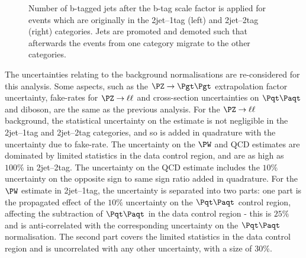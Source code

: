 \begin{figure}
\begin{center}

\end{center}
\caption{
Number of b-tagged jets after the b-tag scale factor is applied for events which
are originally in the 2jet--1tag (left) and 2jet--2tag (right) categories. Jets
are promoted and demoted such that afterwards the events from one category
migrate to the other categories.}
\label{fig:Hhhbtagsystematic}
\end{figure}

The uncertainties relating to the background normalisations are re-considered
for this analysis. Some aspects, such as the $\ZToTauTau$ extrapolation factor
uncertainty, fake-rates for $\PZ\to\ell\ell$ and cross-section uncertainties on
$\ttbar$ and diboson, are the same as the previous analysis. For the
$\PZ\to\ell\ell$ background, the statistical uncertainty on the estimate is not
negligible in the 2jet--1tag and 2jet--2tag categories, and so is added in
quadrature with the uncertainty due to fake-rate. The uncertainty on the
$\PW$ and QCD estimates are dominated by limited statistics in the data control
region, and are as high as $100\%$ in 2jet--2tag. The uncertainty on the QCD
estimate includes the $10\%$ uncertainty on the opposite sign to same sign ratio
added in quadrature. For the $\PW$ estimate in 2jet--1tag, the uncertainty is
separated into two parts: one part is the propagated effect of the $10\%$
uncertainty on the $\ttbar$ control region, affecting the subtraction of
$\ttbar$ in the data control region - this is $25\%$ and is anti-correlated with
the corresponding uncertainty on the $\ttbar$ normalisation. The second part
covers the limited statistics in the data control region and is uncorrelated
with any other uncertainty, with a size of $30\%$.

